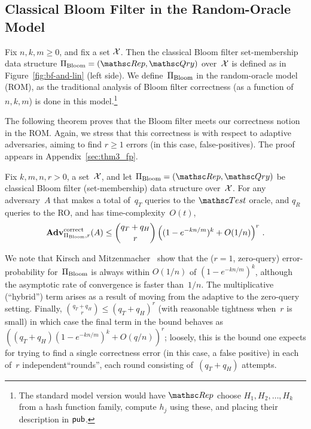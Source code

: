 \subsection{Classical Bloom Filter in the Random-Oracle Model}


Fix $n,k,m \geq 0$, and fix a set ${\cal X}$.  Then the classical Bloom
filter set-membership data structure $\setprim_{\mathrm{Bloom}}=
(\Rep, \Qry)$ over~${\cal X}$ is defined as in
Figure~\ref{fig:bf-and-lin} (left side).  We
define~$\Pi_{\mathrm{Bloom}}$ in the random-oracle model
(ROM), as the traditional analysis of Bloom filter correctness (as a
function of $n,k,m$) is done in this model.\footnote{The standard
model version would have $\Rep$ choose $H_1,H_2,\ldots,H_k$ from a
hash function family, compute $h_j$ using these, and placing their
description in ${\sf pub}$.}

 The following theorem proves that the Bloom
filter meets our correctness notion in the ROM.  Again, we stress
that this correctness is with respect to adaptive adversaries,
aiming to find $r \geq 1$ errors (in this case, false-positives).
The proof appears in Appendix~\ref{sec:thm3_fp}. 

\begin{theorem}\label{thm3}\label{thm:bf-correctness}
Fix $k,m,n,r>0$, a set~${\cal X}$, and let $\setprim_{\mathrm{Bloom}}= (\Rep, \Qry)$ be classical Bloom filter (set-membership) data structure over~${\cal X}$. For any adversary~$A$ that makes a total of~$q_T$ queries to the $\Test$ oracle, and $q_R$ queries to the RO, and has time-complexity~$O(t)$,
\[
\mathrm{\mathbf{Adv}}^{\mathrm{correct}}_{\Pi_{\mathrm{Bloom}},r}(A) \leq  {\dbinom{q_T + q_H}{r}} \left( (1-e^{-kn/m})^k + O(1/n) \right)^r\,.
\]
\end{theorem}
We note that Kirsch and Mitzenmacher~\cite{xxx} show
that the ($r=1$, zero-query) error-probability for~$\Pi_\mathrm{Bloom}$ is
always within $O(1/n)$ of $(1-e^{-kn/m})^k$, although the asymptotic
rate of convergence is faster than~$1/n$.  The multiplicative (``hybrid'') term arises as a result
of moving from the adaptive to the zero-query setting.
Finally, $\binom{q_T+q_H}{r} \leq (q_T+q_H)^r$ (with reasonable tightness when~$r$ is small) in
which case the final term in the bound behaves as
$((q_T+q_H) (1-e^{-kn/m})^k + O(q/n) )^r$; loosely, this is the bound one expects for
trying to find a single correctness error (in this case, a false positive) in each of~$r$ independent``rounds'', each round
consisting of~$(q_T+q_H)$ attempts.


